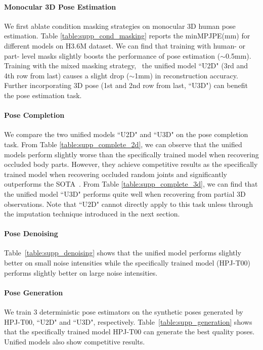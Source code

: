\documentclass[10pt,twocolumn,letterpaper]{article}
\begin{document}
\paragraph{Monocular 3D Pose Estimation} We first ablate condition masking strategies on monocular 3D human pose estimation. Table \ref{table:supp_cond_masking} reports the minMPJPE(mm) for different models on H3.6M dataset.  We can find that training with human- or part- level masks slightly boosts the performance of pose estimation ($\sim$0.5mm). Training with the mixed masking strategy, \ie \ the unified model ``U2D" (3rd and 4th row from last) causes a slight drop ($\sim$1mm) in reconstruction accuracy. Further incorporating 3D pose  (1st and 2nd row from last, ``U3D") can benefit the pose estimation task. 


\paragraph{Pose Completion}
We compare the two unified models ``U2D" and ``U3D" on the pose completion task. From Table \ref{table:supp_complete_2d}, we can observe that the unified models perform slightly worse than the specifically trained model when recovering occluded body parts. However, they achieve competitive results as the specifically trained model when recovering occluded random joints and significantly outperforms the SOTA~\cite{Li_2019_CVPR}.
From Table \ref{table:supp_complete_3d}, we can find that the unified model ``U3D" performs quite well when recovering from partial 3D observations. Note that ``U2D" cannot directly apply to this task unless through the imputation technique introduced in the next section.

\paragraph{Pose Denoising}
Table~\ref{table:supp_denoising} shows that the unified model performs slightly better on small noise intensities while the specifically trained model (HPJ-T00) performs slightly better on large noise intensities. 

\paragraph{Pose Generation}
We train 3 deterministic pose estimators on the synthetic poses generated by HPJ-T00, ``U2D" and ``U3D", respectively. Table~\ref{table:supp_generation} shows that the specifically trained model HPJ-T00 can generate the best quality poses. Unified models also show competitive results.
\end{document}
